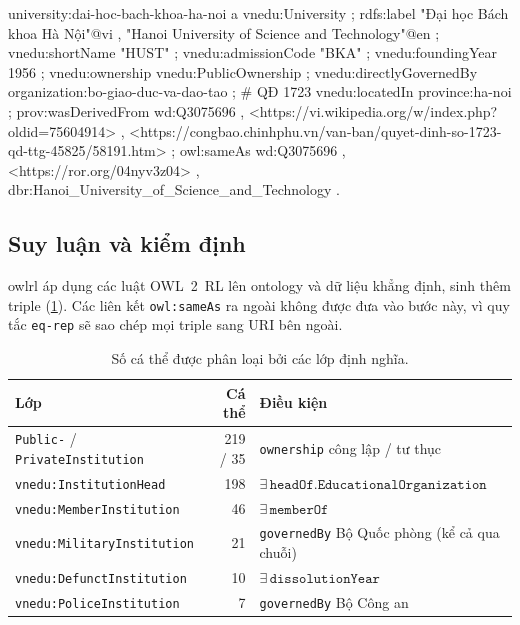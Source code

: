 \documentclass[12pt,a4paper]{article}
\newcommand{\codetitle}[1]{\par\smallskip\noindent{\small\bfseries #1}\par\nopagebreak}
\newcommand{\vn}[1]{\texttt{vnedu:\allowbreak #1}}
\begin{document}
\codetitle{Mô tả RDF của ĐHBK Hà Nội (rút gọn)}\label{lst:hust}
\begin{code}
university:dai-hoc-bach-khoa-ha-noi a vnedu:University ;
    rdfs:label "Đại học Bách khoa Hà Nội"@vi ,
               "Hanoi University of Science and Technology"@en ;
    vnedu:shortName "HUST" ;           vnedu:admissionCode "BKA" ;
    vnedu:foundingYear 1956 ;          vnedu:ownership vnedu:PublicOwnership ;
    vnedu:directlyGovernedBy organization:bo-giao-duc-va-dao-tao ;  # QĐ 1723
    vnedu:locatedIn province:ha-noi ;
    prov:wasDerivedFrom wd:Q3075696 ,
        <https://vi.wikipedia.org/w/index.php?oldid=75604914> ,
        <https://congbao.chinhphu.vn/van-ban/quyet-dinh-so-1723-qd-ttg-45825/58191.htm> ;
    owl:sameAs wd:Q3075696 , <https://ror.org/04nyv3z04> ,
        dbr:Hanoi_University_of_Science_and_Technology .
\end{code}

\subsection{Suy luận và kiểm định}
owlrl áp dụng các luật OWL~2~RL lên ontology và dữ liệu khẳng định, sinh thêm \metricInferredTriples{} triple
(\cref{tab:inferred}). Các liên kết \texttt{owl:sameAs} ra ngoài không được đưa vào bước này, vì quy tắc \texttt{eq-rep}
sẽ sao chép mọi triple sang URI bên ngoài.

\begin{table}[htbp]
\centering\small
\caption{Số cá thể được phân loại bởi các lớp định nghĩa.}\label{tab:inferred}
\begin{tabular}{lrl}
\toprule
Lớp & Cá thể & Điều kiện \\
\midrule
\texttt{Public-} / \texttt{PrivateInstitution} & 219 / 35 & \texttt{ownership} công lập / tư thục \\
\vn{InstitutionHead} & 198 & \(\exists\,\texttt{headOf}.\texttt{EducationalOrganization}\) \\
\vn{MemberInstitution} & 46 & \(\exists\,\texttt{memberOf}\) \\
\vn{MilitaryInstitution} & 21 & \texttt{governedBy} Bộ Quốc phòng (kể cả qua chuỗi) \\
\vn{DefunctInstitution} & 10 & \(\exists\,\texttt{dissolutionYear}\) \\
\vn{PoliceInstitution} & 7 & \texttt{governedBy} Bộ Công an \\
\bottomrule
\end{tabular}
\end{table}
\end{document}
